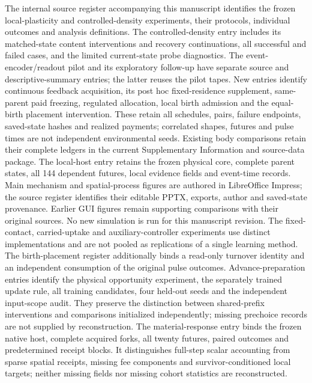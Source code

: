 The internal source register accompanying this manuscript identifies the frozen local-plasticity and controlled-density experiments, their protocols, individual outcomes and analysis definitions. The controlled-density entry includes its matched-state content interventions and recovery continuations, all successful and failed cases, and the limited current-state probe diagnostics. The event-encoder/readout pilot and its exploratory follow-up have separate source and descriptive-summary entries; the latter reuses the pilot tapes. New entries identify continuous feedback acquisition, its post hoc fixed-residence supplement, same-parent paid freezing, regulated allocation, local birth admission and the equal-birth placement intervention. These retain all schedules, pairs, failure endpoints, saved-state hashes and realized payments; correlated shapes, futures and pulse times are not independent environmental seeds. Existing body comparisons retain their complete ledgers in the current Supplementary Information and source-data package. The local-host entry retains the frozen physical core, complete parent states, all 144 dependent futures, local evidence fields and event-time records. Main mechanism and spatial-process figures are authored in LibreOffice Impress; the source register identifies their editable PPTX, exports, author and saved-state provenance. Earlier GUI figures remain supporting comparisons with their original sources. No new simulation is run for this manuscript revision. The fixed-contact, carried-uptake and auxiliary-controller experiments use distinct implementations and are not pooled as replications of a single learning method.
The birth-placement register additionally binds a read-only turnover identity and an independent consumption of the original pulse outcomes. Advance-preparation entries identify the physical opportunity experiment, the separately trained update rule, all training candidates, four held-out seeds and the independent input-scope audit. They preserve the distinction between shared-prefix interventions and comparisons initialized independently; missing prechoice records are not supplied by reconstruction.
The material-response entry binds the frozen native host, complete acquired forks, all twenty futures, paired outcomes and predetermined receipt blocks. It distinguishes full-step scalar accounting from sparse spatial receipts, missing fee components and survivor-conditioned local targets; neither missing fields nor missing cohort statistics are reconstructed.
